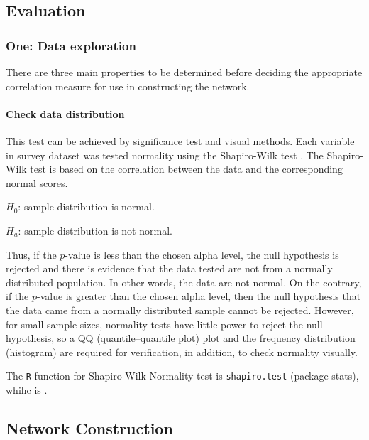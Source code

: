 \documentclass{frontiersSCNS} %
\begin{document}
\subsection*{Evaluation}

\subsubsection*{One: Data exploration}
There are three main properties to be determined before deciding the appropriate correlation measure for use in constructing the network. 

\paragraph{Check data distribution} This test can be achieved by significance test and visual methods. Each variable in survey dataset was tested normality using the Shapiro-Wilk test \citep{ghasemi2012normality}. The Shapiro-Wilk test is based on the correlation between the data and the corresponding normal scores.

$H_{0}$: sample distribution is normal.

$H_{a}$: sample distribution is not normal.

Thus, if the $p$-value is less than the chosen alpha level, the null hypothesis is rejected and there is evidence that the data tested are not from a normally distributed population. In other words, the data are not normal. On the contrary, if the $p$-value is greater than the chosen alpha level, then the null hypothesis that the data came from a normally distributed sample   cannot be rejected. However, for small sample sizes, normality tests have little power to reject the null hypothesis, so a QQ (quantile--quantile plot) plot and the frequency distribution (histogram) are required for verification, in addition, to check normality visually.

The \texttt{R} function for Shapiro-Wilk Normality test is \texttt{shapiro.test} (package stats), whihc is \citep{R:2014}.


\subsection*{Network Construction}
\end{document}
